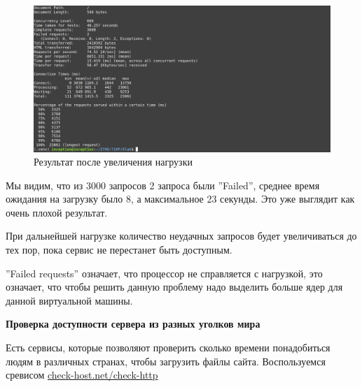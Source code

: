 \documentclass[a4paper, 12pt]{article}
\begin{document}
\newpage
\begin{figure}[h!]
    \noindent
    \centering
    \includegraphics[width=1\linewidth]{pic_ab_3.png}
    \caption{Результат после увеличения нагрузки}
\end{figure}

Мы видим, что из 3000 запросов 2 запроса были ''Failed'', среднее время ожидания на загрузку было 8, а максимальное 23 секунды. Это уже выглядит как очень плохой результат.

При дальнейшей нагрузке количество неудачных запросов будет увеличиваться до тех пор, пока сервис не перестанет быть доступным.

''Failed requests'' означает, что процессор не справляется с нагрузкой, это означает, что чтобы решить данную проблему надо выделить больше ядер для данной виртуальной машины.

\textbf{Проверка доступности сервера из разных уголков мира}

Есть сервисы, которые позволяют проверить сколько времени понадобиться людям в различных странах, чтобы загрузить файлы сайта. Воспользуемся сревисом \href{https://check-host.net/check-http?lang=ru}{check-host.net/check-http}
\end{document}
